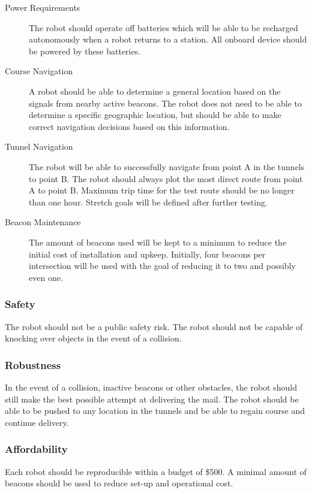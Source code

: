 \documentclass[12pt]{report}
\begin{document}
\begin{description}
    \item[Power Requirements] The robot should operate off batteries which will be able to be recharged autonomously when a robot returns to a station. All onboard device should be powered by these batteries.
    \item[Course Navigation] A robot should be able to determine a general location based on the signals from nearby active beacons. The robot does not need to be able to determine a specific geographic location, but should be able to make correct navigation decisions based on this information.
    \item[Tunnel Navigation] The robot will be able to successfully navigate from point A in the tunnels to point B. The robot should always plot the most direct route from point A to point B. Maximum trip time for the test route should be no longer than one hour. Stretch goals will be defined after further testing. 
    \item[Beacon Maintenance] The amount of beacons used will be kept to a minimum to reduce the initial cost of installation and upkeep. Initially, four beacons per intersection will be used with the goal of reducing it to two and possibly even one.
\end{description}

\subsubsection{Safety}
The robot should not be a public safety risk. The robot should not be capable of knocking over objects in the event of a collision. 

\subsubsection{Robustness}
In the event of a collision, inactive beacons or other obstacles, the robot should still make the best possible attempt at delivering the mail. The robot should be able to be pushed to any location in the tunnels and be able to regain course and continue delivery.

\subsubsection{Affordability}
Each robot should be reproducible within a budget of \$500. A minimal amount of beacons should be used to reduce set-up and operational cost.
\end{document}
